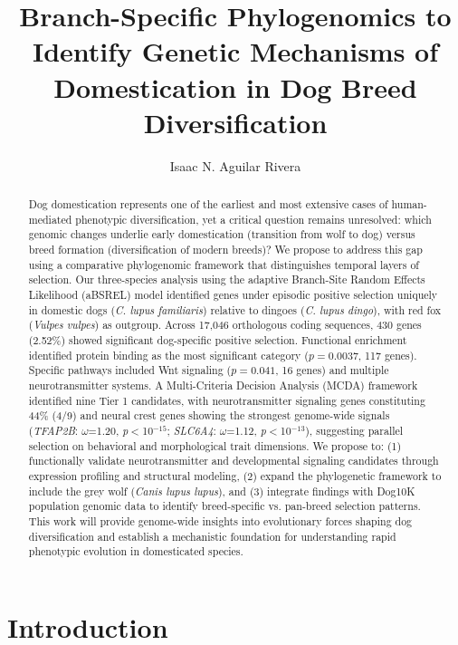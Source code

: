 \documentclass[11pt,letterpaper]{article}
\title{Branch-Specific Phylogenomics to Identify Genetic Mechanisms of Domestication in Dog Breed Diversification}
\author{Isaac N. Aguilar Rivera}
\begin{document}
\maketitle

\begin{abstract}
Dog domestication represents one of the earliest and most extensive cases of human-mediated phenotypic diversification, yet a critical question remains unresolved: which genomic changes underlie early domestication (transition from wolf to dog) versus breed formation (diversification of modern breeds)? We propose to address this gap using a comparative phylogenomic framework that distinguishes temporal layers of selection. Our three-species analysis using the adaptive Branch-Site Random Effects Likelihood (aBSREL) model identified genes under episodic positive selection uniquely in domestic dogs (\textit{C. lupus familiaris}) relative to dingoes (\textit{C. lupus dingo}), with red fox (\textit{Vulpes vulpes}) as outgroup. Across 17,046 orthologous coding sequences, 430 genes (2.52\%) showed significant dog-specific positive selection. Functional enrichment identified protein binding as the most significant category ($p=0.0037$, 117 genes). Specific pathways included Wnt signaling ($p=0.041$, 16 genes) and multiple neurotransmitter systems. A Multi-Criteria Decision Analysis (MCDA) framework identified nine Tier 1 candidates, with neurotransmitter signaling genes constituting 44\% (4/9) and neural crest genes showing the strongest genome-wide signals (\textit{TFAP2B}: $\omega$=1.20, \textit{p}$<$10$^{-15}$; \textit{SLC6A4}: $\omega$=1.12, \textit{p}$<$10$^{-13}$), suggesting parallel selection on behavioral and morphological trait dimensions. We propose to: (1) functionally validate neurotransmitter and developmental signaling candidates through expression profiling and structural modeling, (2) expand the phylogenetic framework to include the grey wolf (\textit{Canis lupus lupus}), and (3) integrate findings with Dog10K population genomic data to identify breed-specific vs. pan-breed selection patterns. This work will provide genome-wide insights into evolutionary forces shaping dog diversification and establish a mechanistic foundation for understanding rapid phenotypic evolution in domesticated species.
\end{abstract}


\section{Introduction}
\end{document}
